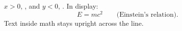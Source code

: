 \documentclass{article}
\begin{document}
$x>0$, , and $y<0$, .
In display: \[ E=mc^2 \qquad \text{(Einstein's relation).} \]
Text inside math stays upright across the line.
\end{document}
